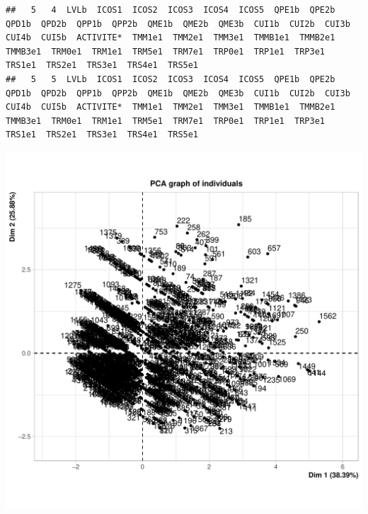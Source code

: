 \documentclass[11pt,a4paper, x11names]{article}\usepackage[]{graphicx}\usepackage[]{color}
\makeatletter
\def\maxwidth{ %
  \ifdim\Gin@nat@width>\linewidth
    \linewidth
  \else
    \Gin@nat@width
  \fi
}
\newenvironment{kframe}{%
 \def\at@end@of@kframe{}%
 \ifinner\ifhmode%
  \def\at@end@of@kframe{\end{minipage}}%
  \begin{minipage}{\columnwidth}%
 \fi\fi%
 \def\FrameCommand##1{\hskip\@totalleftmargin \hskip-\fboxsep
 \colorbox{shadecolor}{##1}\hskip-\fboxsep
     \hskip-\linewidth \hskip-\@totalleftmargin \hskip\columnwidth}%
 \MakeFramed {\advance\hsize-\width
   \@totalleftmargin\z@ \linewidth\hsize
   \@setminipage}}%
 {\par\unskip\endMakeFramed%
 \at@end@of@kframe}
\newenvironment{knitrout}{}{} %
\makeatother
\begin{document}
\begin{knitrout}
\begin{kframe}
\begin{verbatim}
##   5   4  LVLb  ICOS1  ICOS2  ICOS3  ICOS4  ICOS5  QPE1b  QPE2b  QPD1b  QPD2b  QPP1b  QPP2b  QME1b  QME2b  QME3b  CUI1b  CUI2b  CUI3b  CUI4b  CUI5b  ACTIVITE*  TMM1e1  TMM2e1  TMM3e1  TMMB1e1  TMMB2e1  TMMB3e1  TRM0e1  TRM1e1  TRM5e1  TRM7e1  TRP0e1  TRP1e1  TRP3e1  TRS1e1  TRS2e1  TRS3e1  TRS4e1  TRS5e1
##   5   5  LVLb  ICOS1  ICOS2  ICOS3  ICOS4  ICOS5  QPE1b  QPE2b  QPD1b  QPD2b  QPP1b  QPP2b  QME1b  QME2b  QME3b  CUI1b  CUI2b  CUI3b  CUI4b  CUI5b  ACTIVITE*  TMM1e1  TMM2e1  TMM3e1  TMMB1e1  TMMB2e1  TMMB3e1  TRM0e1  TRM1e1  TRM5e1  TRM7e1  TRP0e1  TRP1e1  TRP3e1  TRS1e1  TRS2e1  TRS3e1  TRS4e1  TRS5e1
\end{verbatim}
\end{kframe}
\end{knitrout}

\begin{knitrout}
\color{fgcolor}
\includegraphics[width=\maxwidth]{figure/acp-1} 


\end{knitrout}
\end{document}
